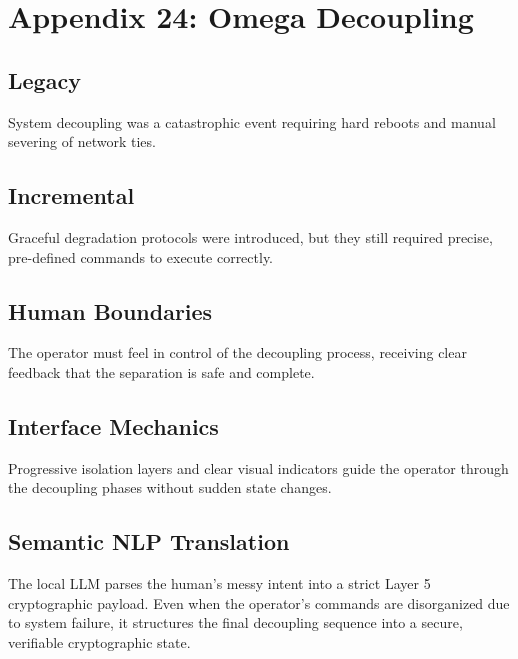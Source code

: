 \chapter{Appendix 24: Omega Decoupling}

\section{Legacy}
System decoupling was a catastrophic event requiring hard reboots and manual severing of network ties.

\section{Incremental}
Graceful degradation protocols were introduced, but they still required precise, pre-defined commands to execute correctly.

\section{Human Boundaries}
The operator must feel in control of the decoupling process, receiving clear feedback that the separation is safe and complete.

\section{Interface Mechanics}
Progressive isolation layers and clear visual indicators guide the operator through the decoupling phases without sudden state changes.

\section{Semantic NLP Translation}
The local LLM parses the human's messy intent into a strict Layer 5 cryptographic payload. Even when the operator's commands are disorganized due to system failure, it structures the final decoupling sequence into a secure, verifiable cryptographic state.
